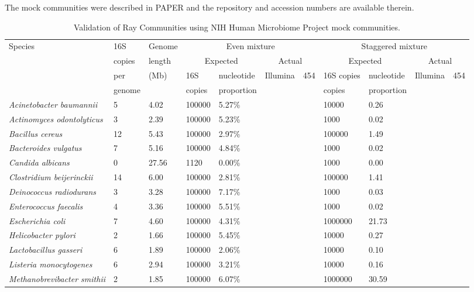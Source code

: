 \documentclass{article}
\begin{document}
\begin{landscape}
\begin{table}
\caption{Validation of Ray Communities using NIH Human Microbiome Project mock communities.}
The mock communities were described in PAPER and the repository and accession numbers are available therein.\\
\label{TableMocks}
\begin{tabular}{lllllllllll}
\hline
Species & 16S& Genome &  \multicolumn{4}{c}{Even mixture} &  \multicolumn{4}{c}{Staggered mixture} \\
 &copies & length & \multicolumn{2}{c}{Expected} & \multicolumn{2}{c}{Actual} & \multicolumn{2}{c}{Expected} & \multicolumn{2}{c}{Actual}  \\
       & per & (Mb) & 16S & nucleotide & Illumina & 454   & 16S copies & nucleotide & Illumina & 454    \\
 & genome &  & copies & proportion & & & copies & proportion\\
\hline
\textit{Acinetobacter baumannii} & 5 & 4.02  & 100000 & 5.27\% & && 10000 & 0.26\\
\textit{Actinomyces odontolyticus} & 3 & 2.39  & 100000 & 5.23\% & && 1000 & 0.02\\
\textit{Bacillus cereus} & 12 & 5.43  & 100000 & 2.97\% & && 100000 & 1.49\\
\textit{Bacteroides vulgatus} & 7 & 5.16  & 100000 & 4.84\% & && 1000 & 0.02\\
\textit{Candida albicans} & 0 & 27.56  & 1120 & 0.00\% & && 1000 & 0.00\\
\textit{Clostridium beijerinckii} & 14 & 6.00  & 100000 & 2.81\% & && 100000 & 1.41\\
\textit{Deinococcus radiodurans} & 3 & 3.28  & 100000 & 7.17\% & && 1000 & 0.03\\
\textit{Enterococcus faecalis} & 4 & 3.36  & 100000 & 5.51\% & && 1000 & 0.02\\
\textit{Escherichia coli} & 7 & 4.60  & 100000 & 4.31\% & && 1000000 & 21.73\\
\textit{Helicobacter pylori} & 2 & 1.66  & 100000 & 5.45\% & && 10000 & 0.27\\
\textit{Lactobacillus gasseri} & 6 & 1.89  & 100000 & 2.06\% & && 10000 & 0.10\\
\textit{Listeria monocytogenes} & 6 & 2.94  & 100000 & 3.21\% & && 10000 & 0.16\\
\textit{Methanobrevibacter smithii} & 2 & 1.85  & 100000 & 6.07\% & && 1000000 & 30.59\\

\end{tabular}
\end{table}
\end{landscape}
\end{document}

